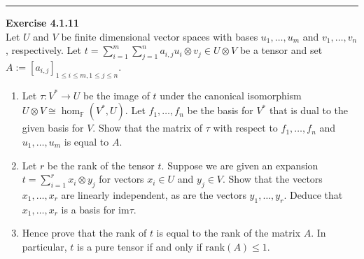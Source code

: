 \documentclass[a4paper, 12pt]{article}
\newenvironment{problem}[2][Exercise]
    { \begin{mdframed}[backgroundcolor=gray!20] \textbf{#1 #2} \\}
    {  \end{mdframed}}
\begin{document}
\noindent\rule{7in}{2.8pt}
\begin{problem}{4.1.11}
Let \(U\) and \(V\) be finite dimensional vector spaces with bases \(u_1,\ldots, u_m\) and \(v_1,\ldots, v_n\), respectively. Let \(t=\sum_{i=1}^{m}\sum_{j=1}^{n}a_{i,j}u_i\otimes v_j\in U\otimes V\) be a tensor 
and set \(A:=[a_{i,j}]_{1\leq i\leq m,1\leq j\leq n}\).
\begin{enumerate}[(1)]
	\item Let \(\tau:V^*\rightarrow U\) be the image of \(t\) under the canonical isomorphism \(U\otimes V\cong \hom_{\mathbb{F}}(V^*,U)\). Let \(f_1,\ldots, f_n\) be the basis for \(V^*\) that is dual to the given basis 
	      for \(V\). Show that the matrix of \(\tau\) with respect to \(f_1,\ldots,f_n\) and \(u_1,\ldots, u_m\) is equal to \(A\).
    \item Let \(r\) be the rank of the tensor \(t\). Suppose we are given an expansion \(t=\sum_{i=1}^{r}x_i\otimes y_j\) for vectors \(x_i\in U\) and \(y_j\in V\). Show that the vectors \(x_1,\ldots, x_r\) are linearly independent, 
          as are the vectors \(y_1,\ldots,y_r\). Deduce that \(x_1,\ldots, x_r\) is a basis for \(\text{im}\tau\).
    \item Hence prove that the rank of \(t\) is equal to the rank of the matrix \(A\). In particular, \(t\) is a pure tensor if and only if \(\text{rank}(A)\leq 1 \).
\end{enumerate}
\end{problem}
\end{document}
